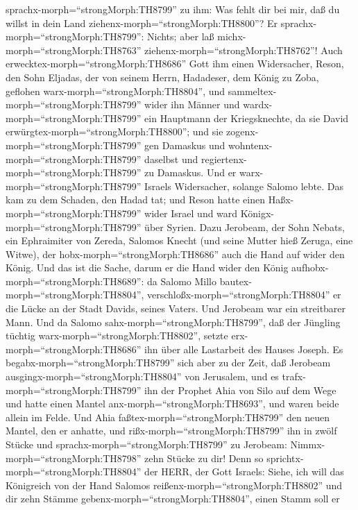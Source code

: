 sprachx-morph=``strongMorph:TH8799'' zu ihm: Was fehlt dir bei mir, daß
du willst in dein Land ziehenx-morph=``strongMorph:TH8800''? Er
sprachx-morph=``strongMorph:TH8799'': Nichts; aber laß
michx-morph=``strongMorph:TH8763'' ziehenx-morph=``strongMorph:TH8762''!
 Auch erwecktex-morph=``strongMorph:TH8686'' Gott ihm einen
Widersacher, Reson, den Sohn Eljadas, der von seinem Herrn, Hadadeser,
dem König zu Zoba, geflohen warx-morph=``strongMorph:TH8804'',
 und sammeltex-morph=``strongMorph:TH8799'' wider ihn
Männer und wardx-morph=``strongMorph:TH8799'' ein Hauptmann der
Kriegsknechte, da sie David erwürgtex-morph=``strongMorph:TH8800''; und
sie zogenx-morph=``strongMorph:TH8799'' gen Damaskus und
wohntenx-morph=``strongMorph:TH8799'' daselbst und
regiertenx-morph=``strongMorph:TH8799'' zu Damaskus.  Und
er warx-morph=``strongMorph:TH8799'' Israels Widersacher, solange Salomo
lebte. Das kam zu dem Schaden, den Hadad tat; und Reson hatte einen
Haßx-morph=``strongMorph:TH8799'' wider Israel und ward
Königx-morph=``strongMorph:TH8799'' über Syrien.  Dazu
Jerobeam, der Sohn Nebats, ein Ephraimiter von Zereda, Salomos Knecht
(und seine Mutter hieß Zeruga, eine Witwe), der
hobx-morph=``strongMorph:TH8686'' auch die Hand auf wider den König.
 Und das ist die Sache, darum er die Hand wider den König
aufhobx-morph=``strongMorph:TH8689'': da Salomo Millo
bautex-morph=``strongMorph:TH8804'',
verschloßx-morph=``strongMorph:TH8804'' er die Lücke an der Stadt
Davids, seines Vaters.  Und Jerobeam war ein streitbarer
Mann. Und da Salomo sahx-morph=``strongMorph:TH8799'', daß der Jüngling
tüchtig warx-morph=``strongMorph:TH8802'', setzte
erx-morph=``strongMorph:TH8686'' ihn über alle Lastarbeit des Hauses
Joseph.  Es begabx-morph=``strongMorph:TH8799'' sich aber
zu der Zeit, daß Jerobeam ausgingx-morph=``strongMorph:TH8804'' von
Jerusalem, und es trafx-morph=``strongMorph:TH8799'' ihn der Prophet
Ahia von Silo auf dem Wege und hatte einen Mantel
anx-morph=``strongMorph:TH8693'', und waren beide allein im Felde.
 Und Ahia faßtex-morph=``strongMorph:TH8799'' den neuen
Mantel, den er anhatte, und rißx-morph=``strongMorph:TH8799'' ihn in
zwölf Stücke  und sprachx-morph=``strongMorph:TH8799'' zu
Jerobeam: Nimmx-morph=``strongMorph:TH8798'' zehn Stücke zu dir! Denn so
sprichtx-morph=``strongMorph:TH8804'' der HERR, der Gott Israels: Siehe,
ich will das Königreich von der Hand Salomos
reißenx-morph=``strongMorph:TH8802'' und dir zehn Stämme
gebenx-morph=``strongMorph:TH8804'',  einen Stamm soll er

